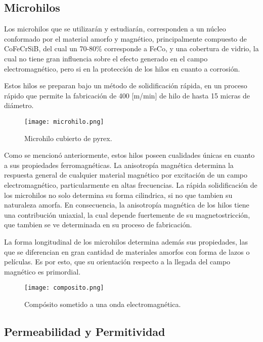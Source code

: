 \documentclass[12pt,letterpaper]{article}
\numberwithin{equation}{section}
\begin{document}
\subsection{Microhilos}

Los microhilos que se utilizarán y estudiarán, corresponden a un núcleo conformado por el material amorfo y magnético, principalmente compuesto de CoFeCrSiB, del cual un 70-80\% corresponde a FeCo, y una cobertura de vidrio, la cual no tiene gran influencia sobre el efecto generado en el campo electromagnético, pero si en la protección de los hilos en cuanto a corrosión.

Estos hilos se preparan bajo un método de solidificación rápida, en un proceso rápido que permite la fabricación de 400 [m/min] de hilo de hasta 15 micras de diámetro.

\begin{figure}[H]
	\centering\texttt{[image: microhilo.png]}
	\caption{Microhilo cubierto de pyrex.  \cite{Wire_theory_3}}
\end{figure}


Como se mencionó anteriormente, estos hilos poseen cualidades únicas en cuanto a sus propiedades ferromagnéticas. La anisotropía magnética determina la respuesta general de cualquier material magnético por excitación de un campo electromagnético, particularmente en altas frecuencias. La rápida solidificación de los microhilos no solo determina su forma cilindrica, si no que tambien su naturaleza amorfa. En consecuencia, la anisotropía magnética de los hilos tiene una contribución uniaxial, la cual depende fuertemente de su magnetostricción, que tambien se ve determinada en su proceso de fabricación.

La forma longitudinal de los microhilos determina además sus propiedades, las que se diferencian en gran cantidad de materiales amorfos con forma de lazos o películas. Es por esto, que su orientación respecto a la llegada del campo magnético es primordial.

\begin{figure}[H]
	\centering\texttt{[image: composito.png]}
	\caption{Compósito sometido a una onda electromagnética. \cite{Wire_theory_1}}
	\label{fig: composito}
\end{figure} 

\subsection{Permeabilidad y Permitividad}
\end{document}
